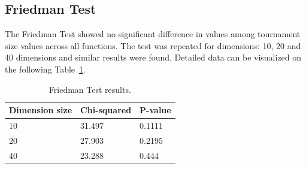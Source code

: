 \subsection{Friedman Test}
The Friedman Test showed no significant difference in values among tournament size values across all functions. The test was repeated for dimensions: 10, 20 and 40 dimensions and similar results were found. Detailed data can be visualized on the following Table~\ref{Friedman_test}. 

\vspace{3mm}
\begin{table}[!ht]
	\centering
	\label{Friedman_test}
	\begin{tabular}{|l|l|l|}
		\hline
		Dimension size      & Chi-squared        & P-value                     \\ \hline
		\multicolumn{1}{|l|}{10} & \multicolumn{1}{l|}{31.497} & \multicolumn{1}{l|}{0.1111} \\ \hline
		\multicolumn{1}{|l|}{20} & \multicolumn{1}{l|}{27.903} & \multicolumn{1}{l|}{0.2195} \\ \hline
		\multicolumn{1}{|l|}{40} & \multicolumn{1}{l|}{23.288} & \multicolumn{1}{l|}{0.444}  \\ \hline
	\end{tabular}
	\caption{Friedman Test results.}

\end{table}
